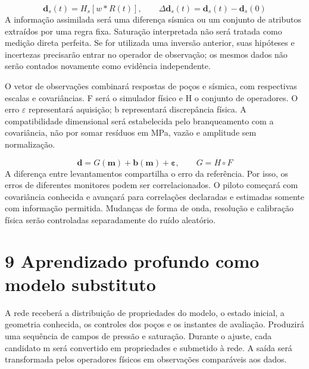 \documentclass[12pt,a4paper]{article}
\begin{document}
\begin{equation}
\mathbf d_s(t)=H_s[w*R(t)],\qquad \Delta\mathbf d_s(t)=\mathbf d_s(t)-\mathbf d_s(0)
\end{equation}
A informação assimilada será uma diferença sísmica ou um conjunto de atributos extraídos por uma regra fixa. Saturação interpretada não será tratada como medição direta perfeita. Se for utilizada uma inversão anterior, suas hipóteses e incertezas precisarão entrar no operador de observação; os mesmos dados não serão contados novamente como evidência independente.\par
O vetor de observações combinará respostas de poços e sísmica, com respectivas escalas e covariâncias. F será o simulador físico e H o conjunto de operadores. O erro \(\varepsilon\) representará aquisição; b representará discrepância física. A compatibilidade dimensional será estabelecida pelo branqueamento com a covariância, não por somar resíduos em MPa, vazão e amplitude sem normalização.\par

\begin{equation}
\mathbf d=G(\mathbf m)+\mathbf b(\mathbf m)+\boldsymbol\varepsilon,\qquad G=H\circ F
\end{equation}
A diferença entre levantamentos compartilha o erro da referência. Por isso, os erros de diferentes monitores podem ser correlacionados. O piloto começará com covariância conhecida e avançará para correlações declaradas e estimadas somente com informação permitida. Mudanças de forma de onda, resolução e calibração física serão controladas separadamente do ruído aleatório.\par

\newpage
\section*{9 Aprendizado profundo como modelo substituto}
A rede receberá a distribuição de propriedades do modelo, o estado inicial, a geometria conhecida, os controles dos poços e os instantes de avaliação. Produzirá uma sequência de campos de pressão e saturação. Durante o ajuste, cada candidato m será convertido em propriedades e submetido à rede. A saída será transformada pelos operadores físicos em observações comparáveis aos dados.\par
\end{document}
